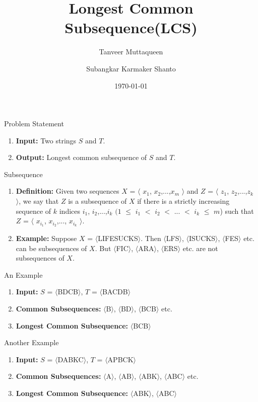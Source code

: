 \documentclass{beamer}
\title{Longest Common Subsequence(LCS)}
\author{Tanveer Muttaqueen \and Subangkar Karmaker Shanto}
\institute[Universities of Somewhere and Elsewhere] %
{
Department of Computer Science \& Engineering\\
Bangladesh University of Engineering and Technology
}
\date{\today}
\begin{document}
\begin{frame}
  \titlepage
\end{frame}


\begin{frame}{Problem Statement}
\begin{enumerate}
    \onslide\item<1-> \textbf{Input:} Two strings $S$ and $T$. 
    \onslide\item<2-> \textbf{Output:} Longest common subsequence of $S$ and $T$.
\end{enumerate}
\end{frame}

\begin{frame}{Subsequence}
\begin{enumerate}
    \onslide\item<1-> \textbf{Definition:} Given two
sequences $X$ = $\langle$ $x_1$, $x_2$,...,$x_m$ $\rangle$ and $Z$  = $\langle$ $z_1$, $z_2$,...,$z_k$ $\rangle$, we say that $Z$ is a subsequence of $X$ if there is a strictly increasing sequence of $k$ indices $i_1$, $i_2$,...,$i_k$  $(1$ $\leq$ $i_1$ $<$ $i_2$ $<$ ... $<$ $i_k$ $\leq$ $m$) such that $Z$ = $\langle$ $x_{i_1}$, $x_{i_2}$,..., $x_{i_k}$ $\rangle$. 
    \onslide\item<2-> \textbf{Example:} Suppose $X$ = $\langle$LIFESUCKS$\rangle$. Then $\langle$LFS$\rangle$, $\langle$ISUCKS$\rangle$, $\langle$FES$\rangle$ etc. can be  subsequences of $X$. But $\langle$FIC$\rangle$, $\langle$ARA$\rangle$, $\langle$ERS$\rangle$ etc. are not subsequences of $X$. 
\end{enumerate}
\end{frame}


\begin{frame}{An Example}
\begin{enumerate}
    \onslide\item<1-> \textbf{Input:} $S$ = $\langle$BDCB$\rangle$,  $T$ = $\langle$BACDB$\rangle$
    \onslide\item<2-> \textbf{Common Subsequences:} $\langle$B$\rangle$, $\langle$BD$\rangle$, $\langle$BCB$\rangle$ etc.
    \onslide\item<3-> \textbf{Longest Common Subsequence:} $\langle$BCB$\rangle$
\end{enumerate}
\end{frame}



\begin{frame}{Another Example}
\begin{enumerate}
    \onslide\item<1-> \textbf{Input:} $S$ = $\langle$DABKC$\rangle$,  $T$ = $\langle$APBCK$\rangle$
    \onslide\item<2-> \textbf{Common Subsequences:} $\langle$A$\rangle$, $\langle$AB$\rangle$, $\langle$ABK$\rangle$, $\langle$ABC$\rangle$ etc.
    \onslide\item<3-> \textbf{Longest Common Subsequence:} $\langle$ABK$\rangle$, $\langle$ABC$\rangle$
\end{enumerate}
\end{frame}
\end{document}
